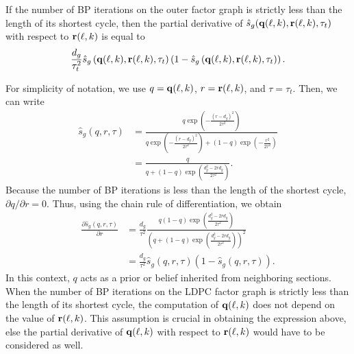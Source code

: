 \documentclass[journal]{IEEEtran}
\begin{document}
\begin{lemma} 
\label{lemma:partialderivative_pme_appendix}
If the number of BP iterations on the outer factor graph is strictly less than the length of its shortest cycle, then the partial derivative of $\hat{s}_{g}(\mathbf{q}(\ell, k), \mathbf{r}(\ell, k), \tau_{t})$ with respect to $\mathbf{r}(\ell, k)$ is equal to
\begin{equation} \label{equation:partialderivative_pme_appendix}
    \frac{d_{g}}{\tau_t^2} \hat{s}_{g}\left( \mathbf{q}(\ell, k), \mathbf{r}(\ell, k), \tau_{t} \right)  
    \left( 1 - \hat{s}_{g} \left( \mathbf{q}(\ell, k), \mathbf{r}(\ell, k), \tau_{t} \right) \right) .
\end{equation}
\end{lemma}
\begin{IEEEproof}
For simplicity of notation, we use $q = \mathbf{q}(\ell, k)$, $r = \mathbf{r}(\ell, k)$, and $\tau = \tau_{t}$.
Then, we can write
\begin{equation*}
    \begin{split}
        \hat{s}_{g}(q, r, \tau)
        & = \frac{q \exp \left( - \frac{ \left( r - d_{g} \right)^2}{2 \tau^2} \right)}{ q \exp \left( - \frac{ \left( r -  d_{g} \right)^2}{2 \tau^2} \right) + (1-q) \exp \left( -\frac{r^2}{2 \tau^2} \right)} \\
        & = \frac{q}{q + (1 - q) \exp \left( \frac{d_{g}^2 - 2rd_{g}}{2\tau^2} \right)} .
    \end{split}
\end{equation*}
Because the number of BP iterations is less than the length of the shortest cycle, ${\partial q} / {\partial r}  = 0$.  Thus, using the chain rule of differentiation, we obtain
\begin{equation*}
    \begin{split}
        \frac{\partial \hat{s}_{g}(q, r, \tau)}{\partial r}
        &= \frac{d_{g}}{\tau^2} 
        \frac{q(1-q)\exp \left( \frac{d_{g}^2 - 2 r d_{g}}{2 \tau^2} \right)}{\left( q + (1 - q) \exp \left( \frac{ d_{g}^2 - 2 r d_{g}}{2 \tau^2} \right) \right)^2} \\
        &= \frac{d_{g}}{\tau^2}\hat{s}_{g}(q, r, \tau)(1 - \hat{s}_{g}(q, r, \tau)) .
    \end{split}
\end{equation*}
In this context, $q$ acts as a prior or belief inherited from neighboring sections.
When the number of BP iterations on the LDPC factor graph is strictly less than the length of its shortest cycle, the computation of $\mathbf{q}(\ell, k)$ does not depend on the value of $\mathbf{r}(\ell, k)$.
This assumption is crucial in obtaining the expression above, else the partial derivative of $\mathbf{q}(\ell, k)$ with respect to $\mathbf{r}(\ell, k)$ would have to be considered as well.
\end{IEEEproof}
\end{document}
